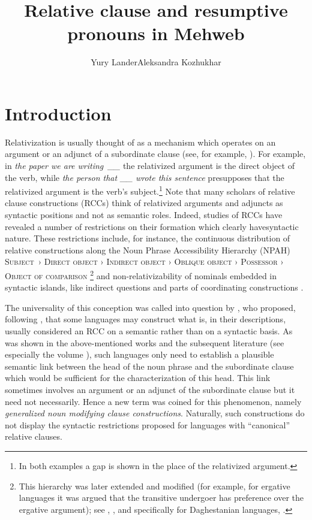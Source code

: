 ﻿\documentclass[output=paper]{langsci/langscibook}
\title{Relative clause and resumptive pronouns in Mehweb}
\author{Yury Lander\affiliation{National Research University Higher School of Economics}\lastand Aleksandra Kozhukhar\affiliation{National Research University Higher School of Economics}}
\begin{document}
\maketitle

\section{Introduction}

Relativization is usually thought of as a mechanism which operates on an
argument or an adjunct of a subordinate clause (see, for example, \citealt{devries2002}).
For example, in \emph{the paper we are writing~\_\_}
the relativized argument is the direct object of the verb, while
\emph{the person that \_\_ wrote this sentence} presupposes that the
relativized argument is the verb's subject.\footnote{In both examples a
  gap is shown in the place of the relativized argument.} Note that many
scholars of relative clause constructions (RCCs) think of relativized
arguments and adjuncts as syntactic positions and not as semantic roles.
Indeed, studies of RCCs have revealed a number of restrictions on their
formation which clearly have\pagebreak[3] syntactic nature. These restrictions
include, for instance, the continuous distribution of relative
constructions along the Noun Phrase Accessibility Hierarchy (NPAH)\linebreak
\textsc{Subject~› Direct object › Indirect object › Oblique object ›
Possessor › Object of comparison} \citep{keenan-comrie1977}\footnote{This
  hierarchy was later extended and modified (for example, for ergative
  languages it was argued that the transitive undergoer has preference
  over the ergative argument); see \citet[211ff]{lehmann1984}, \citet{liao2000}, and
  specifically for Daghestanian languages, \citet{lyutikova1999,lyutikova2001}.} and
non-relativizability of nominals embedded in syntactic islands, like
indirect questions and parts of coordinating constructions \citep{ross1967}.

The universality of this conception was called into question by
\citet{comrie1996,comrie1998}, who proposed, following
\citet{matsumoto1988,matsumoto1997}, that some
languages may construct what is, in their descriptions, usually
considered an RCC on a semantic rather than on a syntactic basis. As was
shown in the above-mentioned works and the subsequent literature (see
especially the volume \citealt{matsumoto-etal2017}), such languages only need
to establish a plausible semantic link between the head of the noun
phrase and the subordinate clause which would be sufficient for the
characterization of this head. This link sometimes involves an argument
or an adjunct of the subordinate clause but it need not necessarily.
Hence a new term was coined for this phenomenon, namely
\emph{generalized noun modifying clause constructions}. Naturally, such
constructions do not display the syntactic restrictions proposed for
languages with ``canonical'' relative clauses.
\end{document}
